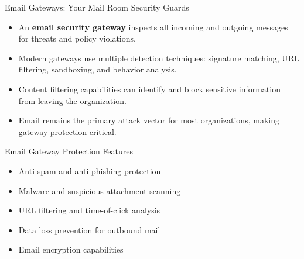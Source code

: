 \documentclass{beamer}
\begin{document}
                    \begin{frame}{Email Gateways: Your Mail Room Security Guards}
                    \begin{itemize}
                        \item An \textbf{email security gateway} inspects all incoming and outgoing messages for threats and policy violations.
                        \item Modern gateways use multiple detection techniques: signature matching, URL filtering, sandboxing, and behavior analysis.
                        \item Content filtering capabilities can identify and block sensitive information from leaving the organization.
                        \item Email remains the primary attack vector for most organizations, making gateway protection critical.
                    \end{itemize}
                    
                    \begin{exampleblock}{Email Gateway Protection Features}
                    \begin{itemize}
                        \item Anti-spam and anti-phishing protection
                        \item Malware and suspicious attachment scanning
                        \item URL filtering and time-of-click analysis
                        \item Data loss prevention for outbound mail
                        \item Email encryption capabilities
                    \end{itemize}
                    \end{exampleblock}
                    \end{frame}
\end{document}

